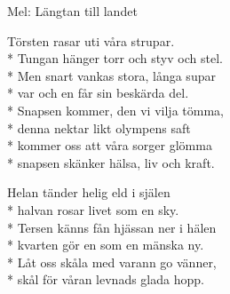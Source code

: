 \begin{SongText}
    \begin{SongInfo}
        Mel: Längtan till landet
    \end{SongInfo}
    \begin{SongVerse}
        Törsten rasar uti våra strupar.\\*%
        Tungan hänger torr och styv och stel.\\*%
        Men snart vankas stora, långa supar\\*%
        var och en får sin beskärda del.\\*%
        Snapsen kommer, den vi vilja tömma,\\*%
        denna nektar likt olympens saft\\*%
        kommer oss att våra sorger glömma\\*%
        snapsen skänker hälsa, liv och kraft.
    \end{SongVerse}
    \begin{SongVerse}
        Helan tänder helig eld i själen\\*%
        halvan rosar livet som en sky.\\*%
        Tersen känns fån hjässan ner i hälen\\*%
        kvarten gör en som en mänska ny.\\*%
        Låt oss skåla med varann go vänner,\\*%
        skål för våran levnads glada hopp.
    \end{SongVerse}
\end{SongText}

